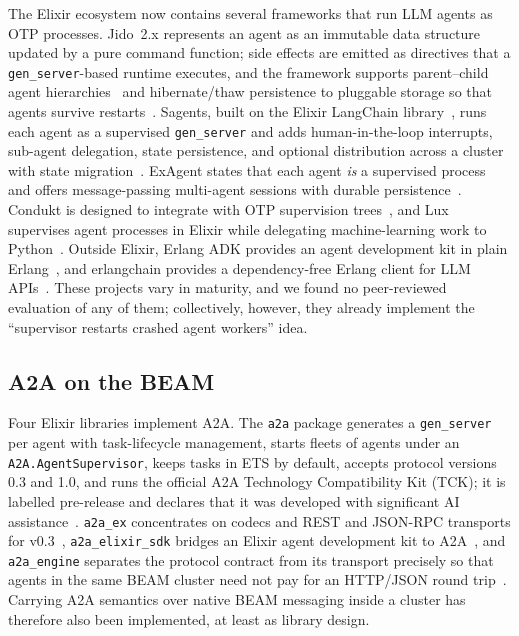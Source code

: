 \documentclass[conference,letterpaper]{IEEEtran}
\newcommand{\code}[1]{\texttt{#1}}
\newcommand{\gs}{\code{gen\_server}}
\begin{document}
The Elixir ecosystem now contains several frameworks that run LLM agents as
OTP processes. Jido~2.x represents an agent as an immutable data structure
updated by a pure command function; side effects are emitted as directives
that a \gs-based runtime executes, and the framework supports parent--child
agent hierarchies~\cite{jido} and hibernate/thaw persistence to pluggable
storage so that agents survive restarts~\cite{jido-storage}. Sagents, built
on the Elixir LangChain library~\cite{langchain-ex}, runs each agent as a
supervised \gs{} and adds human-in-the-loop interrupts, sub-agent
delegation, state persistence, and optional distribution across a cluster
with state migration~\cite{sagents,sagents-readme}. ExAgent states that each
agent \emph{is} a supervised process and offers message-passing
multi-agent sessions with durable persistence~\cite{exagent}. Condukt is
designed to integrate with OTP supervision trees~\cite{condukt}, and Lux
supervises agent processes in Elixir while delegating machine-learning work
to Python~\cite{lux}. Outside Elixir, Erlang ADK provides an agent
development kit in plain Erlang~\cite{erlang-adk}, and erlangchain provides
a dependency-free Erlang client for LLM APIs~\cite{erlangchain}. These
projects vary in maturity, and we found no peer-reviewed evaluation of any
of them; collectively, however, they already implement the ``supervisor
restarts crashed agent workers'' idea.

\subsection{A2A on the BEAM}

Four Elixir libraries implement A2A. The \code{a2a} package generates a
\gs{} per agent with task-lifecycle management, starts fleets of agents
under an \code{A2A.AgentSupervisor}, keeps tasks in ETS by default, accepts
protocol versions 0.3 and 1.0, and runs the official A2A Technology
Compatibility Kit (TCK); it is labelled pre-release and declares that it was
developed with significant AI assistance~\cite{a2a-actioncard}.
\code{a2a\_ex} concentrates on codecs and REST and JSON-RPC transports for
v0.3~\cite{a2a-ex}, \code{a2a\_elixir\_sdk} bridges an Elixir agent
development kit to A2A~\cite{a2a-elixir-sdk}, and \code{a2a\_engine}
separates the protocol contract from its transport precisely so that agents
in the same BEAM cluster need not pay for an HTTP/JSON round
trip~\cite{a2a-engine}. Carrying A2A semantics over native BEAM messaging
inside a cluster has therefore also been implemented, at least as library
design.
\end{document}
